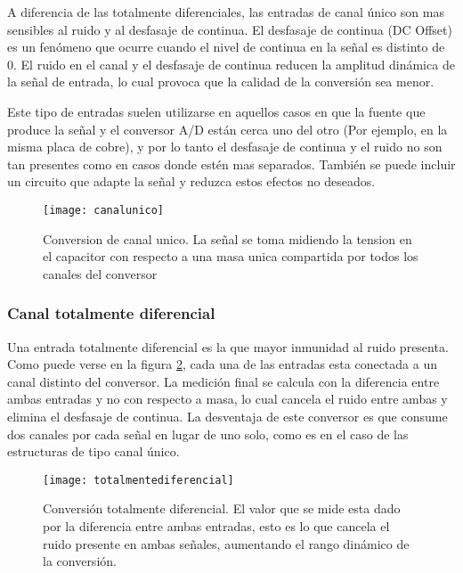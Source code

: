A diferencia de las totalmente diferenciales, las entradas de canal único son mas sensibles al ruido y al desfasaje de continua. El desfasaje de continua (DC Offset) es un fenómeno que ocurre cuando el nivel de continua en la señal es distinto de 0. El ruido en el canal y el desfasaje de continua reducen la amplitud dinámica de la señal de entrada, lo cual provoca que la calidad de la conversión sea menor.\cite{dc_offset}

Este tipo de entradas suelen utilizarse en aquellos casos en que la fuente que produce la señal y el conversor A/D están cerca uno del otro (Por ejemplo, en la misma placa de cobre), y por lo tanto el desfasaje de continua y el ruido no son tan presentes como en casos donde estén mas separados. También se puede incluir un circuito que adapte la señal y reduzca estos efectos no deseados.\cite{tipos_canales}

\begin{figure}[h]
  \centering
  \texttt{[image: canalunico]}
  \caption{Conversion de canal unico. La señal se toma midiendo la tension en el capacitor con respecto a una masa unica compartida por todos los canales del conversor}\label{fig:canalunico}
\end{figure}


\subsubsection{Canal totalmente diferencial}
\label{subs:canal_totalmente_diferencial}

Una entrada totalmente diferencial es la que mayor inmunidad al ruido presenta. Como puede verse en la figura \ref{fig:totalmentediferencial}, cada una de las entradas esta conectada a un canal distinto del conversor. La medición final se calcula con la diferencia entre ambas entradas y no con respecto a masa, lo cual cancela el ruido entre ambas y elimina el desfasaje de continua. La desventaja de este conversor es que consume dos canales por cada señal en lugar de uno solo, como es en el caso de las estructuras de tipo canal único.\cite{tipos_canales}

\begin{figure}[h]
  \centering
  \texttt{[image: totalmentediferencial]}
  \caption{Conversión totalmente diferencial. El valor que se mide esta dado por la diferencia entre ambas entradas, esto es lo que cancela el ruido presente en ambas señales, aumentando el rango dinámico de la conversión.}\label{fig:totalmentediferencial}
\end{figure}

